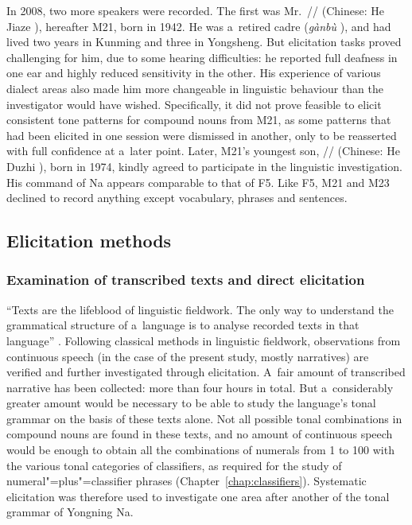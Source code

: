 In 2008, two more speakers were recorded. The first was Mr.\ // (Chinese: He Jiaze ), hereafter M21, born in 1942. He was a~retired cadre (\textit{gànbù} ), and had lived two
years in Kunming and three in Yongsheng. But elicitation tasks proved
challenging for him, due to some hearing difficulties: he reported full deafness in
one ear and highly reduced sensitivity in the other. His experience of various dialect areas also
made him more changeable in linguistic behaviour than the investigator would have
wished. Specifically, it did not prove feasible to elicit consistent tone patterns for {compound}
nouns from M21, as some patterns that had been elicited in one session were dismissed in another, only to be
reasserted with full confidence at a~later point. Later, M21’s youngest son, //
(Chinese: He Duzhi ), born in 1974, kindly agreed to participate in the linguistic
investigation. His command of Na appears comparable to that of F5. Like F5, M21 and M23 declined to
record anything except vocabulary, phrases and sentences. %

\subsection{Elicitation methods}
\label{sec:elicitationmethods}
\largerpage[-1]
\subsubsection{Examination of transcribed texts and direct elicitation}
\label{sec:examinationoftranscribedtextsanddirectelicitation}
\largerpage

“Texts are the lifeblood of linguistic fieldwork. The only way to understand the grammatical
structure of a~language is to analyse recorded texts in that language” \citep[22]{Dixon2007}. Following classical methods in linguistic fieldwork, observations from continuous speech (in the
case of the present study, mostly narratives) are verified and further investigated through
elicitation. A~fair amount of transcribed narrative has been collected: more than four hours in total. But
a~considerably greater amount would be necessary to be able to study the language’s tonal grammar on
the basis of these texts alone. Not all possible tonal combinations in {compound} nouns are found in
these texts, and no amount of continuous speech would be enough to obtain all the combinations of
numerals from 1 to 100 with the various tonal categories of classifiers, as required for the study
of {numeral}"=plus"=classifier phrases (Chapter~\ref{chap:classifiers}). Systematic elicitation was therefore used to
investigate one area after another of the tonal grammar of Yongning Na.

